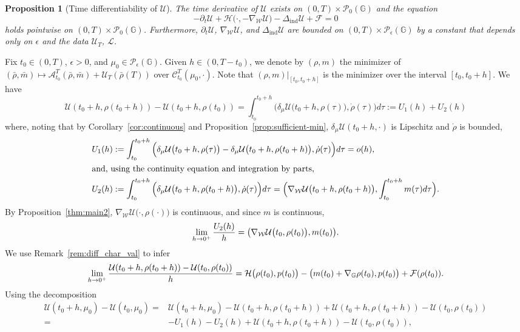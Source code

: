 \documentclass[10pt]{article}
\newtheorem{proposition}[theorem]{Proposition}
\numberwithin{equation}{section}
\newcommand{\cA}{ \mathcal{A}}
\newcommand{\cC}{ \mathcal{C}}
\newcommand{\cF}{ \mathcal{F}}
\newcommand{\cH}{ \mathcal{H}}
\newcommand{\cL}{ \mathcal{L}}
\newcommand{\cP}{ \mathcal{P}}
\newcommand{\cU}{ \mathcal{U}}
\newcommand{\cW}{ \mathcal{W}}
\newcommand{\bG}{\mathbb G}
\def\cH{\mathcal{H}}
\def\cL{\mathcal{L}}
\def\G{\mathbb{G}}
\begin{document}
%
\begin{proposition}[Time differentiability of $\cU$] \label{prop:1differential} The time derivative of $\cU$ exists on $(0,T)\times \cP_0(\G)$ and the equation
\[
-\partial_t \cU + \cH\big(\cdot, -\nabla_{\cW}\cU\big)- \Delta_\text{ind}\cU + \cF=0
\]
holds pointwise on $(0,T)\times \cP_0(\G)$. Furthermore, $\partial_t \cU$, $\nabla_{\cW}\cU$, and $\Delta_\text{ind}\cU$ are bounded on $(0, T) \times \cP_\epsilon(\G)$ by a constant that depends only on $\epsilon$ and the data $\cU_T$, $\cL$.
\end{proposition}
%
\proof{} Fix $t_0 \in (0,T)$, $\epsilon>0$, and $\mu_0 \in \cP_\epsilon(\G)$. Given $h \in (0, T-t_0)$, we denote by $(\rho, m)$ the minimizer of $(\bar \rho, \bar m) \mapsto \cA_{t_0}^{T}(\bar \rho, \bar m) +\cU_{T}(\bar \rho({T}))$ over $\cC_{t_0}^{T}(\mu_0, \cdot)$. Note that $(\rho, m)|_{[t_0, t_0+h]}$ is the minimizer over the interval $[t_0, t_0+h]$. We have 
\[
\cU(t_0+h, \rho(t_0+h)) -\cU(t_0+h,\rho(t_0))=\int_{t_0}^{t_0+h} \Big(\delta_{\mu} \cU\big(t_0+h, \rho(\tau)\big), \dot \rho(\tau)\Big) d\tau:=U_1(h)+U_2(h)
\]
where, noting that by Corollary~\ref{cor:continuous} and Proposition~\ref{prop:sufficient-min}, $\delta_{\mu} \cU(t_0+h,\cdot)$ is Lipschitz and $\dot \rho$ is bounded,
\begin{align*}
U_1(h)&:= \int_{t_0}^{t_0+h} \Big(\delta_{\mu} \cU\big(t_0+h, \rho(\tau)\big)-\delta_{\mu}  \cU\big(t_0+h, \rho(t_0+h)\big), \dot \rho(\tau)\Big) d\tau = o(h),\\
\intertext{and, using the continuity equation and integration by parts,}
U_2(h)&:=\int_{t_0}^{t_0+h} \Big(\delta_{\mu}  \cU\big(t_0+h, \rho(t_0+h)\big), \dot \rho(\tau)\Big) d\tau = \Big(\nabla_\cW \cU\big(t_0+h, \rho(t_0+h)\big), \int_{t_0}^{t_0+h} m(\tau)d\tau\Big).
\end{align*}
By Proposition~\ref{thm:main2}, $\nabla_\cW \cU\big(\cdot, \rho(\cdot)\big)$ is continuous, and since $m$ is continuous,  
\begin{equation}\label{eq:aug29.2025.1}
\lim_{h \to 0^+}{U_2(h)\over h}=\big(\nabla_\cW \cU\big(t_0, \rho(t_0)\big), m(t_0)\big).
\end{equation}
%
We use Remark~\ref{rem:diff_char_val} to infer
\begin{align}
 \lim_{h \to 0^+}{\cU(t_0+h,\rho(t_0+h)) - \cU(t_0,\rho(t_0)) \over h}
= \cH\big(\rho(t_0), p(t_0)\big)- \big( m(t_0)+ \nabla_\bG \rho(t_0), p(t_0)\big) + \cF(\rho(t_0)).\label{eq:aug29.2025.2}
\end{align}
Using the decomposition
\begin{align*}%
\cU(t_0+h,\mu_0)-\cU(t_0,\mu_0)  =& \cU(t_0+h,\mu_0) - \cU(t_0+h,\rho(t_0+h)) +  \cU(t_0+h,\rho(t_0+h))-\cU(t_0,\rho(t_0)) \\
=& -U_1(h)-U_2(h)+  \cU(t_0+h,\rho(t_0+h)) -\cU(t_0,\rho(t_0)),
\end{align*}%
\end{document}
